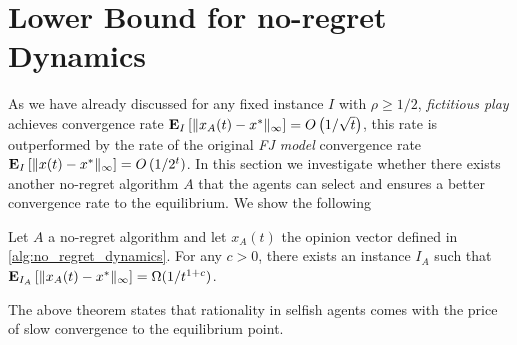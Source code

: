 \section{Lower Bound for no-regret Dynamics}\label{s:lower_bound}

As we have already discussed for any fixed instance $I$ with
$\rho\geq 1/2$, \emph{fictitious play} achieves convergence rate
$\bm{\mathrm{E}}_{I} \left[ \| x_A(t)-x^* \|_{\infty} \right]=O\left(1/\sqrt{t}\right)$,
this rate is outperformed by the rate of the original \emph{FJ model}
convergence rate
$\bm{\mathrm{E}}_{I} \left[ \| x(t)-x^* \|_{\infty} \right]=O\left(1/2^{t}\right)$.
In this section we investigate whether there exists another no-regret
algorithm $A$ that the agents can select and ensures a better convergence rate
to the equilibrium.  We show the following

\begin{theorem}\label{t:dynamics_lower_bound}
  Let $A$ a no-regret algorithm and let $x_A(t)$ the
  opinion vector defined in \ref{alg:no_regret_dynamics}.
  For any $c>0$, there exists an instance $I_A$ such that
  $\bm{\mathrm{E}}_{I_A} \left[ \| x_A(t)-x^* \|_{\infty} \right] = \Omega(1/t^{1+c})$.
\end{theorem}
The above theorem states that rationality in selfish agents comes with
the price of slow convergence to the equilibrium point.

